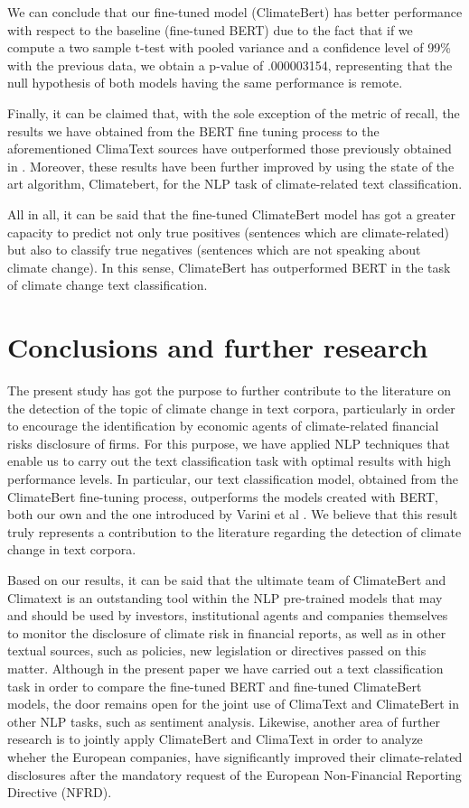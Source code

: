 \documentclass[runningheads]{llncs}
\begin{document}
We can conclude that our fine-tuned model (ClimateBert) has better performance with respect to the baseline (fine-tuned BERT) due to the fact that if we compute a two sample t-test with pooled variance and a confidence level of 99\% with the previous data, we obtain a p-value of .000003154, representing that the null hypothesis of both models having the same performance is remote. 

Finally, it can be claimed that, with the sole exception of the metric of recall, the results we have obtained from the BERT fine tuning process to the aforementioned ClimaText sources have outperformed those previously obtained in \cite{varini2020climatext}. Moreover, these results have been further improved by using the state of the art algorithm, Climatebert, for the NLP task of climate-related text classification.  

All in all, it can be said that the fine-tuned ClimateBert model has got a greater capacity to predict not only true positives (sentences which are climate-related) but also to classify true negatives (sentences which are not speaking about climate change). In this sense, ClimateBert has outperformed BERT in the task of climate change text classification.   

\section{Conclusions and further research}

The present study has got the purpose to further contribute to the literature on the detection of the topic of climate change in text corpora, particularly in order to encourage the identification by economic agents of climate-related financial risks disclosure of firms. For this purpose, we have applied NLP techniques that enable us to carry out the text classification task with optimal results with high performance levels. In particular, our text classification model, obtained from the ClimateBert fine-tuning process, outperforms the models created with BERT, both our own and the one introduced by Varini et al \cite{varini2020climatext}.  We believe that this result truly represents a contribution to the literature regarding the detection of climate change in text corpora. 

Based on our results, it can be said that the ultimate team of ClimateBert and Climatext is an outstanding tool within the NLP pre-trained models that may and should be used by investors, institutional agents and companies themselves to monitor the disclosure of climate risk in financial reports, as well as in other textual sources, such as policies, new legislation or directives passed on this matter. Although in the present paper we have carried out a text classification task in order to compare the fine-tuned BERT and fine-tuned ClimateBert models, the door remains open for the joint use of  ClimaText and ClimateBert in other NLP tasks, such as sentiment analysis. Likewise, another area of further research is to jointly apply ClimateBert and ClimaText in order to analyze wheher the European companies, have significantly improved their climate-related disclosures after the mandatory request of the European Non-Financial Reporting Directive (NFRD). 



\end{document}
